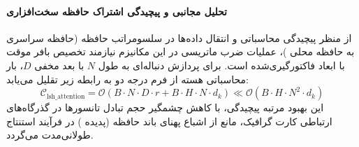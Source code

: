 \paragraph{تحلیل مجانبی و پیچیدگی اشتراک حافظه سخت‌افزاری}
از منظر پیچیدگی محاسباتی و انتقال داده‌ها در سلسومراتب حافظه (حافظه سراسری  به حافظه محلی )، عملیات ضرب ماتریسی در این مکانیزم نیازمند تخصیص بافر موقت با ابعاد فاکتورگیری‌شده است. برای پردازش دنباله‌ای به طول $N$ با بعد مخفی $D$، بار محاسباتی هسته از فرم درجه دو به رابطه زیر تقلیل می‌یابد:
\begin{equation}
\label{eq:complexity_lsh_attention}
\mathcal{C}_{\text{lsh\_attention}} = \mathcal{O}\left( B \cdot N \cdot D \cdot r + B \cdot H \cdot N \cdot d_k \right) \ll \mathcal{O}\left( B \cdot H \cdot N^2 \cdot d_k \right)
\end{equation}
این بهبود مرتبه پیچیدگی، با کاهش چشمگیر حجم تبادل تانسورها در گذرگاه‌های ارتباطی کارت گرافیک، مانع از اشباع پهنای باند حافظه (پدیده ) در فرآیند استنتاج طولانی‌مدت می‌گردد.
